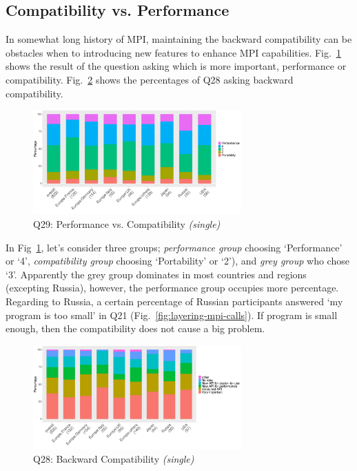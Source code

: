 \documentclass[conference,10pt,letterpaper]{IEEEtran}
\def\myquote#1{`#1'}
\begin{document}
\subsection{Compatibility vs. Performance}

In somewhat long history of MPI, maintaining the backward
compatibility can be obstacles when to introducing new features to
enhance MPI capabilities. Fig.~\ref{fig:performance-vs-compatibility} shows the 
result of the question asking which is more important, performance or 
compatibility. Fig.~\ref{fig:compatibility} shows the percentages of
Q28 asking backward compatibility.

\begin{figure}[htb]
\begin{center}
\includegraphics[width=8cm]{R-scripts/Q29.pdf}
\caption{Q29: Performance vs. Compatibility {\it(single)}}
\label{fig:performance-vs-compatibility}
\end{center}
\end{figure}

In Fig~\ref{fig:performance-vs-compatibility}, let's consider three
groups; {\it performance group} choosing \myquote{Performance} or
\myquote{4}, {\it compatibility group} choosing \myquote{Portability} or
\myquote{2}), and {\it grey group} who chose \myquote{3}. Apparently the grey
group dominates in most countries and regions (excepting Russia),
however, the performance group occupies more percentage. Regarding to
Russia, a certain percentage of Russian participants answered
\myquote{my program is too small} in Q21
(Fig.~\ref{fig:layering-mpi-calls}). If program is small enough, then
the compatibility does not cause a big problem.

\begin{figure}[htb]
\begin{center}
\includegraphics[width=8cm]{R-scripts/Q28.pdf}
\caption{Q28: Backward Compatibility {\it(single)}}
\label{fig:compatibility}
\end{center}
\end{figure}
\end{document}
